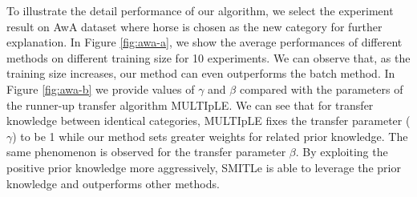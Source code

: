 To illustrate the detail performance of our algorithm, we select the experiment result on AwA dataset where horse is chosen as the new category for further explanation. In Figure \ref{fig:awa-a}, we show the average performances of different methods on different training size for 10 experiments. We can observe that, as the training size increases, our method can even outperforms the batch method.
In Figure \ref{fig:awa-b} we provide values of $\gamma$ and $\beta$ compared with the parameters of the runner-up transfer algorithm MULTIpLE. We can see that for transfer knowledge between identical categories, MULTIpLE fixes the transfer parameter ($\gamma$) to be 1 while our method sets greater weights for related prior knowledge. The same phenomenon is observed for the transfer parameter $\beta$. By exploiting the positive prior knowledge more aggressively, SMITLe is able to leverage the prior knowledge and outperforms other methods.


